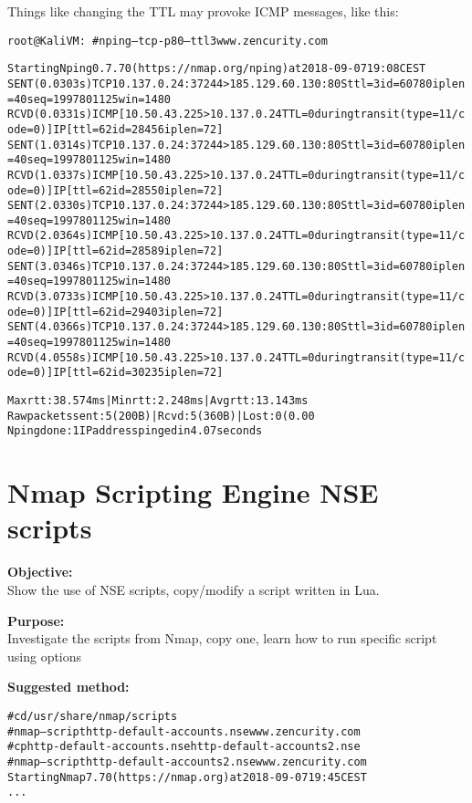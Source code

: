 \documentclass[a4paper,11pt,notitlepage]{report}
\begin{document}
Things like changing the TTL may provoke ICMP messages, like this:
\begin{alltt}\footnotesize
root@KaliVM:~# nping --tcp -p 80 --ttl 3 www.zencurity.com

Starting Nping 0.7.70 ( https://nmap.org/nping ) at 2018-09-07 19:08 CEST
SENT (0.0303s) TCP 10.137.0.24:37244 > 185.129.60.130:80 S ttl=3 id=60780 iplen=40  seq=1997801125 win=1480
RCVD (0.0331s) ICMP [10.50.43.225 > 10.137.0.24 TTL=0 during transit (type=11/code=0) ] IP [ttl=62 id=28456 iplen=72 ]
SENT (1.0314s) TCP 10.137.0.24:37244 > 185.129.60.130:80 S ttl=3 id=60780 iplen=40  seq=1997801125 win=1480
RCVD (1.0337s) ICMP [10.50.43.225 > 10.137.0.24 TTL=0 during transit (type=11/code=0) ] IP [ttl=62 id=28550 iplen=72 ]
SENT (2.0330s) TCP 10.137.0.24:37244 > 185.129.60.130:80 S ttl=3 id=60780 iplen=40  seq=1997801125 win=1480
RCVD (2.0364s) ICMP [10.50.43.225 > 10.137.0.24 TTL=0 during transit (type=11/code=0) ] IP [ttl=62 id=28589 iplen=72 ]
SENT (3.0346s) TCP 10.137.0.24:37244 > 185.129.60.130:80 S ttl=3 id=60780 iplen=40  seq=1997801125 win=1480
RCVD (3.0733s) ICMP [10.50.43.225 > 10.137.0.24 TTL=0 during transit (type=11/code=0) ] IP [ttl=62 id=29403 iplen=72 ]
SENT (4.0366s) TCP 10.137.0.24:37244 > 185.129.60.130:80 S ttl=3 id=60780 iplen=40  seq=1997801125 win=1480
RCVD (4.0558s) ICMP [10.50.43.225 > 10.137.0.24 TTL=0 during transit (type=11/code=0) ] IP [ttl=62 id=30235 iplen=72 ]

Max rtt: 38.574ms | Min rtt: 2.248ms | Avg rtt: 13.143ms
Raw packets sent: 5 (200B) | Rcvd: 5 (360B) | Lost: 0 (0.00%)
Nping done: 1 IP address pinged in 4.07 seconds
\end{alltt}



\chapter{Nmap Scripting Engine NSE scripts}
\label{ex:nmap-nse}

{\bf Objective:} \\
Show the use of NSE scripts, copy/modify a script written in Lua.

{\bf Purpose:}\\
Investigate the scripts from Nmap, copy one, learn how to run specific script using options

{\bf Suggested method:}\\
\begin{alltt}
# cd /usr/share/nmap/scripts
# nmap --script http-default-accounts.nse www.zencurity.com
# cp http-default-accounts.nse http-default-accounts2.nse
# nmap --script http-default-accounts2.nse www.zencurity.com
Starting Nmap 7.70 ( https://nmap.org ) at 2018-09-07 19:45 CEST
...
\end{alltt}
\end{document}
